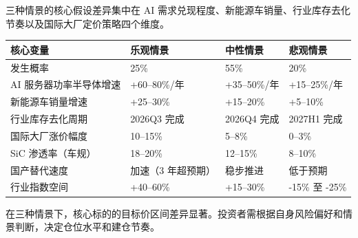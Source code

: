 三种情景的核心假设差异集中在 AI 需求兑现程度、新能源车销量、行业库存去化节奏以及国际大厂定价策略四个维度。

\begin{exhibitbox}[表 11-3：三情景核心假设对比]
\centering
\small
\begin{tabularx}{\textwidth}{X L{3.8cm} L{3.8cm} L{3.8cm}}
\toprule
\textbf{核心变量} & \textbf{乐观情景} & \textbf{中性情景} & \textbf{悲观情景} \\
\midrule
发生概率 & 25\% & 55\% & 20\% \\
\midrule
AI 服务器功率半导体增速 & +60–80\%/年 & +35–50\%/年 & +15–25\%/年 \\
新能源车销量增速 & +25–30\% & +15–20\% & +5–10\% \\
行业库存去化周期 & 2026Q3 完成 & 2026Q4 完成 & 2027H1 完成 \\
国际大厂涨价幅度 & 10–15\% & 5–8\% & 0–3\% \\
SiC 渗透率（车规） & 18–20\% & 12–15\% & 8–10\% \\
国产替代速度 & 加速（3 年超预期） & 稳步推进 & 低于预期 \\
\midrule
行业指数空间 & +40–60\% & +15–30\% & -15\% 至 -25\% \\
\bottomrule
\end{tabularx}
\end{exhibitbox}

在三种情景下，核心标的的目标价区间差异显著。投资者需根据自身风险偏好和情景判断，决定仓位水平和建仓节奏。

